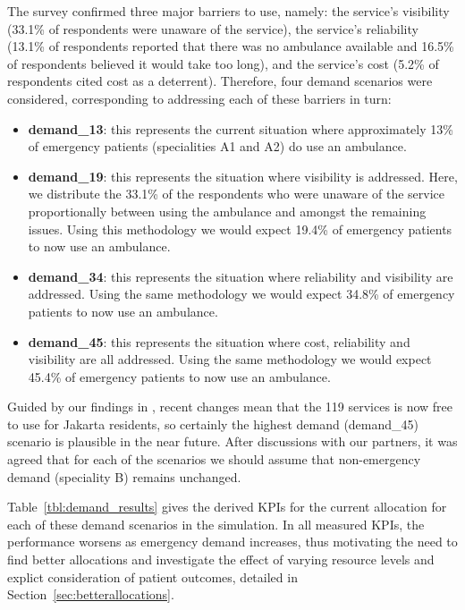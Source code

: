 \documentclass[preprint,12pt]{elsarticle}
\begin{document}
The survey confirmed three major barriers to use, namely: the service's visibility (33.1\% of respondents were unaware of the service), the service's reliability (13.1\% of respondents reported that there was no ambulance available and 16.5\% of respondents believed it would take too long), and the service's cost (5.2\% of respondents cited cost as a deterrent). Therefore, four demand scenarios were considered, corresponding to addressing each of these barriers in turn:

\begin{itemize}
  \item \textbf{demand\_13}: this represents the current situation where approximately 13\% of emergency patients (specialities A1 and A2) do use an ambulance.
  \item \textbf{demand\_19}: this represents the situation where visibility is addressed. Here, we distribute the 33.1\% of the respondents who were unaware of the service proportionally between using the ambulance and amongst the remaining issues. Using this methodology we would expect 19.4\% of emergency patients to now use an ambulance.  
  \item \textbf{demand\_34}: this represents the situation where reliability and visibility are addressed. Using the same methodology we would expect 34.8\% of emergency patients to now use an ambulance.
  \item \textbf{demand\_45}: this represents the situation where cost, reliability and visibility are all addressed. Using the same methodology we would expect 45.4\% of emergency patients to now use an ambulance. 
\end{itemize}

Guided by our findings in \cite{BriceSyaribahNoor2022Esui}, recent changes mean that the 119 services is now free to use for Jakarta residents, so certainly the highest demand (demand\_45) scenario is plausible in the near future.
After discussions with our partners, it was agreed that for each of the scenarios we should assume that non-emergency demand (speciality B) remains unchanged.  

Table~\ref{tbl:demand_results} gives the derived KPIs for the current allocation for each of these demand scenarios in the simulation. In all measured KPIs, the performance worsens as emergency demand increases, thus motivating the need to find better allocations and investigate the effect of varying resource levels and explict consideration of patient outcomes, detailed in Section~\ref{sec:betterallocations}.
\end{document}
